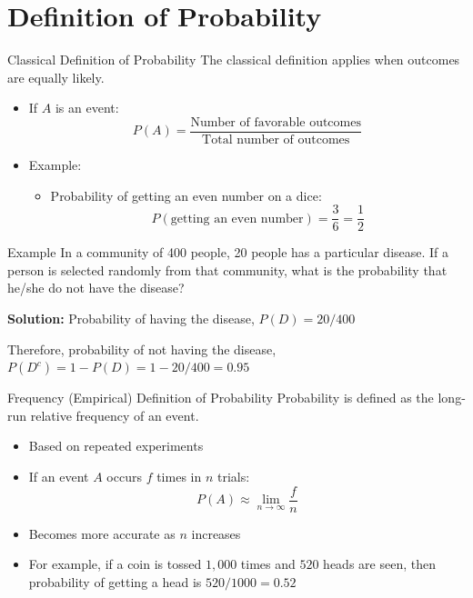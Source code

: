 \documentclass[12pt, aspectratio=169]{beamer}
\begin{document}
	\section{Definition of Probability}


	\begin{frame}{Classical Definition of Probability}
		The classical definition applies when outcomes are equally likely.
		\begin{itemize}
			\item If $A$ is an event:
			\[
				P(A) = \frac{\text{Number of favorable outcomes}}{\text{Total number of outcomes}}
			\]
			\item Example:
			\begin{itemize}
				\item Probability of getting an even number on a dice:
				\[
					P(\text{getting an even number}) = \frac{3}{6} = \frac{1}{2}
				\]
			\end{itemize}
		\end{itemize}
	\end{frame}


	\begin{frame}{Example}
		In a community of 400 people, 20 people has a particular disease. If a person is selected randomly from that community, what is the probability that he/she do not have the disease?

		\vspace{0.5em}

		\textbf{Solution:} Probability of having the disease, $P(D) = 20/400$

		\vspace{0.5em}
		Therefore, probability of not having the disease, $P(D^c) = 1-P(D) = 1-20/400=0.95$
	\end{frame}


	\begin{frame}{Frequency (Empirical) Definition of Probability}
		Probability is defined as the long-run relative frequency of an event.
		\begin{itemize}
			\item Based on repeated experiments
			\item If an event $A$ occurs $f$ times in $n$ trials:
			\[
				P(A) \approx \lim_{n \to \infty} \frac{f}{n}
			\]
			\item Becomes more accurate as $n$ increases
			\item For example, if a coin is tossed $1{,}000$ times and $520$ heads are seen, then probability of getting a head is $520/1000=0.52$
		\end{itemize}
	\end{frame}
\end{document}
